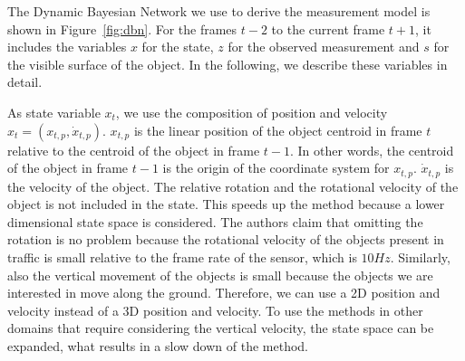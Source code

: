 \documentclass[twoside,a4paper,article]{combine}
\begin{document}
The Dynamic Bayesian Network we use to derive the measurement model is
shown in Figure~\ref{fig:dbn}. For the frames $t-2$ to the current
frame $t+1$, it includes the variables $x$ for the state, $z$ for the
observed measurement and $s$ for the visible surface of the object. In
the following, we describe these variables in detail.

As state variable $x_t$, we use the composition of position and
velocity $x_t=(x_{t,p},\dot{x}_{t,p})$. $x_{t,p}$ is the linear
position of the object centroid in frame $t$ relative to the centroid
of the object in frame $t-1$. In other words, the centroid of the
object in frame $t-1$ is the origin of the coordinate system for
$x_{t,p}$. $\dot{x}_{t,p}$ is the velocity of the object. The relative
rotation and the rotational velocity of the object is not included in
the state. This speeds up the method because a lower dimensional state
space is considered. The authors claim that omitting the rotation is
no problem because the rotational velocity of the objects present in
traffic is small relative to the frame rate of the sensor, which is
$10Hz$. Similarly, also the vertical movement of the objects is
small because the objects we are interested in move along the
ground. Therefore, we can use a 2D position and velocity instead of a
3D position and velocity. To use the methods in other domains that
require considering the vertical velocity, the state space can be
expanded, what results in a slow down of the method.
\end{document}
